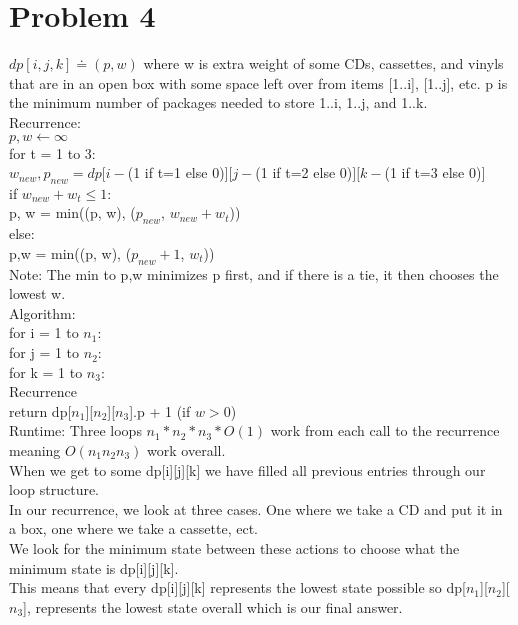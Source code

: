 \documentclass[11pt,letter]{article}
\newcommand{\2}{\{0, 1\}}
\newcommand{\1}{\mathds{1}}
\newcommand{\tab}{\hspace*{3mm}}
\theoremstyle{definition}
\begin{document}
\section*{Problem 4}

$dp[i, j, k] \doteq (p,w)$ where w is extra weight of some CDs, cassettes, and vinyls that are in an open box with some space left over from items [1..i], [1..j], etc. p is the minimum number of packages needed to store 1..i, 1..j, and 1..k.\\

Recurrence: \\
$p, w \leftarrow \infty$\\
for t = 1 to 3:\\
\tab $w_{new}, p_{new} = dp[i - $(1 if t=1 else 0)$][j - $(1 if t=2 else 0)$][k - $(1 if t=3 else 0)$]$\\
\tab if $w_{new} + w_t \leq 1$:\\
\tab \tab p, w = min((p, w), ($p_{new}$, $w_{new} + w_t$))\\
\tab else:\\
\tab \tab p,w = min((p, w), ($p_{new} + 1$, $w_t$))\\

Note: The min to p,w minimizes p first, and if there is a tie, it then chooses the lowest w.\\

Algorithm: \\

for i = 1 to $n_1$:\\
\tab for j = 1 to $n_2$:\\
\tab \tab for k = 1 to $n_3$: \\
\tab \tab \tab Recurrence\\
return dp[$n_1$][$n_2$][$n_3$].p + 1 (if $w > 0$)\\

Runtime: Three loops $n_1 * n_2 * n_3 * O(1)$ work from each call to the recurrence meaning $O(n_1n_2n_3)$ work overall.\\

When we get to some dp[i][j][k] we have filled all previous entries through our loop structure. \\
In our recurrence, we look at three cases. One where we take a CD and put it in a box, one where we take a cassette, ect.\\
We look for the minimum state between these actions to choose what the minimum state is dp[i][j][k]. \\
This means that every dp[i][j][k] represents the lowest state possible so dp[$n_1$][$n_2$][$n_3$], represents the lowest state overall which is our final answer.
\end{document}
